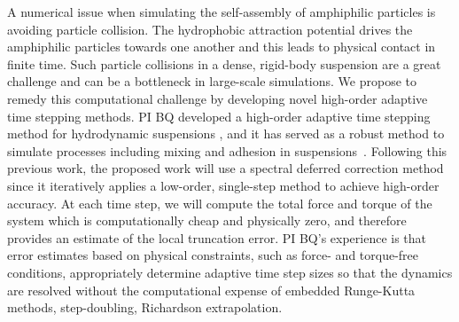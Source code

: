 A numerical issue when simulating the self-assembly of amphiphilic
particles is avoiding particle collision. The hydrophobic attraction
potential drives the amphiphilic particles towards one another and this
leads to physical contact in finite time. Such particle collisions in a
dense, rigid-body suspension are a great challenge and can be a
bottleneck in large-scale simulations. We propose to remedy this
computational challenge by developing novel high-order adaptive time
stepping methods. PI BQ developed a high-order adaptive time
stepping method for hydrodynamic suspensions \cite{qua-bir2016}, and it
has served as a robust method to simulate processes including mixing and
adhesion in suspensions~\cite{qua-vee-you2019, kab-qua-bir2017}.
Following this previous work, the proposed work will use a spectral
deferred correction method~\cite{dut-gre-rok2000} since it iteratively
applies a low-order, single-step method to achieve high-order accuracy.
At each time step, we will compute the total force and torque of the
system which is computationally cheap and physically zero, and therefore
provides an estimate of the local truncation error. PI BQ's experience
is that error estimates based on physical constraints, such as force-
and torque-free conditions, appropriately determine adaptive time step
sizes so that the dynamics are resolved without the computational
expense of embedded Runge-Kutta methods, step-doubling, Richardson
extrapolation.


